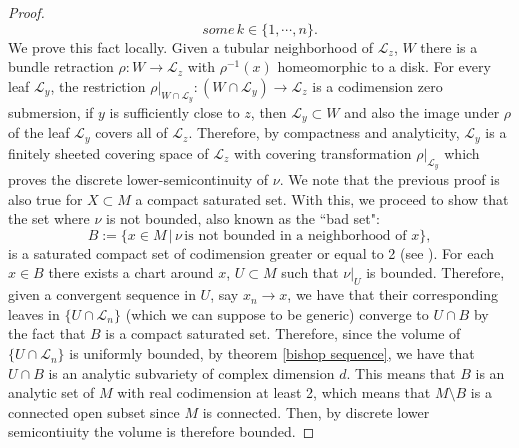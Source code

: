 \documentclass[letterpaper]{book}
\newcommand{\nat}{\ensuremath{ \mathbb N }}
\begin{document}
\begin{proof}
$${some }\,k\in\lbrace 1,\cdots,n\rbrace.
$$
We prove this fact locally. Given a tubular neighborhood of $\mathcal{L}_z$,
$W$ there is a bundle retraction $\rho: W\rightarrow\mathcal{L}_z$ with $\rho^{-1}(x)$
homeomorphic to a disk. For every leaf $\mathcal{L}_y$, the restriction $\rho\vert_{W\cap\mathcal{L}_y}:(W\cap\mathcal{L}_y)\rightarrow\mathcal{L}_z$
is a codimension zero submersion, if $y$ is sufficiently close to $z$, then
$\mathcal{L}_y\subset W$ and also the image under $\rho$ of the leaf $\mathcal{L}_y$ covers all of $\mathcal{L}_z$.
Therefore, by compactness and analyticity, $\mathcal{L}_y$ is a finitely sheeted covering space of $\mathcal{L}_z$ with covering transformation
$\rho\vert_{\mathcal{L}_y}$ which proves the discrete lower-semicontinuity of $\nu$.
We note that the previous proof is also true for $X\subset M$ a compact saturated set.  With
this, we proceed to show that the set where $\nu$ is not bounded, also known as
the ``bad set":
$$
B:=\lbrace x\in M\,\vert\, \nu\,\text{is not bounded in a neighborhood of }x\rbrace,
$$
is a saturated compact set of codimension greater or equal to 2 (see \cite{Epstein}). For
each $x\in B$ there exists a chart around $x$, $U\subset M$ such that
$\nu\vert_U$ is bounded. Therefore, given a convergent sequence in $U$,
say $x_n\rightarrow x$, we have that their corresponding leaves in $\lbrace
U\cap\mathcal{L}_n\rbrace$ (which we can suppose to be generic) converge to
$U\cap B$ by the fact that $B$ is a compact saturated set. Therefore, since the
volume of $\lbrace U\cap\mathcal{L}_n\rbrace$ is uniformly bounded, by theorem
\ref{bishop sequence}, we have that $U \cap B$ is an analytic subvariety of
complex dimension $d$. This means that $B$ is an analytic set of $M$ with real
codimension at least 2, which means that $M\setminus B$ is a connected open
subset since $M$ is connected. Then, by discrete lower semicontiuity the volume is therefore bounded.



\end{proof}
\end{document}
